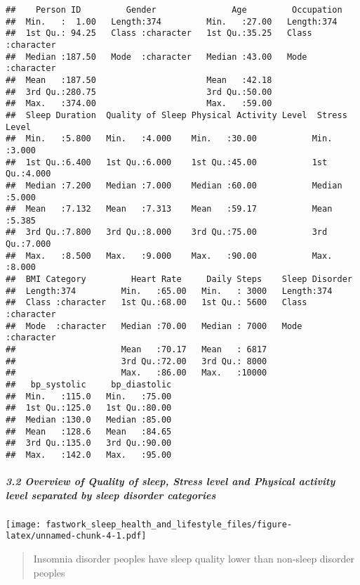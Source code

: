 \documentclass[
]{article}
\begin{document}
\begin{verbatim}
##    Person ID         Gender               Age         Occupation       
##  Min.   :  1.00   Length:374         Min.   :27.00   Length:374        
##  1st Qu.: 94.25   Class :character   1st Qu.:35.25   Class :character  
##  Median :187.50   Mode  :character   Median :43.00   Mode  :character  
##  Mean   :187.50                      Mean   :42.18                     
##  3rd Qu.:280.75                      3rd Qu.:50.00                     
##  Max.   :374.00                      Max.   :59.00                     
##  Sleep Duration  Quality of Sleep Physical Activity Level  Stress Level  
##  Min.   :5.800   Min.   :4.000    Min.   :30.00           Min.   :3.000  
##  1st Qu.:6.400   1st Qu.:6.000    1st Qu.:45.00           1st Qu.:4.000  
##  Median :7.200   Median :7.000    Median :60.00           Median :5.000  
##  Mean   :7.132   Mean   :7.313    Mean   :59.17           Mean   :5.385  
##  3rd Qu.:7.800   3rd Qu.:8.000    3rd Qu.:75.00           3rd Qu.:7.000  
##  Max.   :8.500   Max.   :9.000    Max.   :90.00           Max.   :8.000  
##  BMI Category         Heart Rate     Daily Steps    Sleep Disorder    
##  Length:374         Min.   :65.00   Min.   : 3000   Length:374        
##  Class :character   1st Qu.:68.00   1st Qu.: 5600   Class :character  
##  Mode  :character   Median :70.00   Median : 7000   Mode  :character  
##                     Mean   :70.17   Mean   : 6817                     
##                     3rd Qu.:72.00   3rd Qu.: 8000                     
##                     Max.   :86.00   Max.   :10000                     
##   bp_systolic     bp_diastolic  
##  Min.   :115.0   Min.   :75.00  
##  1st Qu.:125.0   1st Qu.:80.00  
##  Median :130.0   Median :85.00  
##  Mean   :128.6   Mean   :84.65  
##  3rd Qu.:135.0   3rd Qu.:90.00  
##  Max.   :142.0   Max.   :95.00
\end{verbatim}

\hypertarget{overview-of-quality-of-sleep-stress-level-and-physical-activity-level-separated-by-sleep-disorder-categories}{%
\subparagraph{3.2 Overview of Quality of sleep, Stress level and
Physical activity level separated by sleep disorder
categories}\label{overview-of-quality-of-sleep-stress-level-and-physical-activity-level-separated-by-sleep-disorder-categories}}

\texttt{[image: fastwork\_sleep\_health\_and\_lifestyle\_files/figure-latex/unnamed-chunk-4-1.pdf]}

\begin{quote}
Insomnia disorder peoples have sleep quality lower than non-sleep
disorder peoples
\end{quote}
\end{document}
